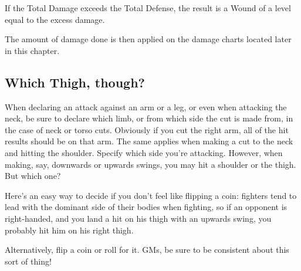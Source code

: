 \documentclass[oneside,11pt,english]{book}
\begin{document}
If the Total Damage exceeds the Total Defense, the result is a Wound of a level equal to the excess 
damage.

The amount of damage done is then applied on the damage charts located later in this chapter.

\subsection*{Which Thigh, though?}
When declaring an attack against an arm or a leg, or even when attacking the neck, be sure to declare 
which limb, or from which side the cut is made from, in the case of neck or torso cuts. Obviously if you 
cut the right arm, all of the hit results should be on that arm. The same applies when making a cut to the 
neck and hitting the shoulder. Specify which side you’re attacking.
However, when making, say, downwards or upwards swings, you may hit a shoulder or the thigh. But 
which one?

Here’s an easy way to decide if you don’t feel like flipping a coin: fighters tend to lead with the dominant 
side of their bodies when fighting, so if an opponent is right-handed, and you land a hit on his thigh with 
an upwards swing, you probably hit him on his right thigh.

Alternatively, flip a coin or roll for it. GMs, be sure to be consistent about this sort of thing!

\newpage
\end{document}
